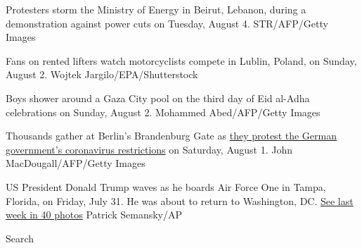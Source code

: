Protesters storm the Ministry of Energy in Beirut, Lebanon, during a
demonstration against power cuts on Tuesday, August 4. STR/AFP/Getty
Images

Fans on rented lifters watch motorcyclists compete in Lublin, Poland, on
Sunday, August 2. Wojtek Jargilo/EPA/Shutterstock

Boys shower around a Gaza City pool on the third day of Eid al-Adha
celebrations on Sunday, August 2. Mohammed Abed/AFP/Getty Images

Thousands gather at Berlin's Brandenburg Gate as
\href{https://www.cnn.com/2020/08/01/world/berlin-germany-covid-19-protest-intl/index.html}{they
protest the German government's coronavirus restrictions} on Saturday,
August 1. John MacDougall/AFP/Getty Images

US President Donald Trump waves as he boards Air Force One in Tampa,
Florida, on Friday, July 31. He was about to return to Washington, DC.
\href{http://www.cnn.com/2020/07/30/world/gallery/week-in-photos-0731/index.html}{See
last week in 40 photos} Patrick Semansky/AP

Search

